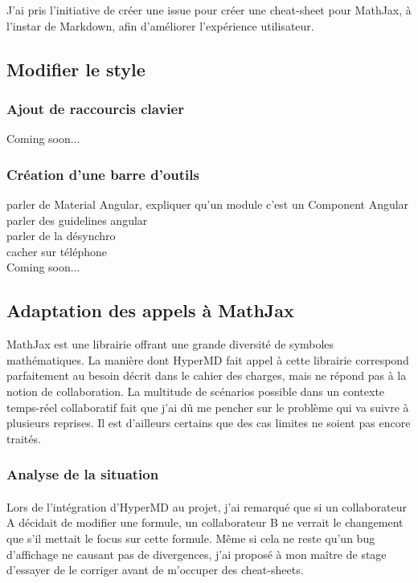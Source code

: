 \documentclass[12pt]{article}
\begin{document}
J'ai pris l'initiative de créer une issue pour créer une cheat-sheet pour MathJax, à l'instar de Markdown, afin d'améliorer l'expérience utilisateur.\\

\newpage
\subsection{Modifier le style}
\subsubsection{Ajout de raccourcis clavier}
Coming soon...

\subsubsection{Création d'une barre d'outils}
parler de Material Angular, expliquer qu'un module c'est un Component Angular\\
parler des guidelines angular\\
parler de la désynchro\\
cacher sur téléphone\\
Coming soon...

\newpage
\subsection{Adaptation des appels à MathJax}
MathJax est une librairie offrant une grande diversité de symboles mathématiques. La manière dont HyperMD fait appel à cette librairie correspond parfaitement au besoin décrit dans le cahier des charges, mais ne répond pas à la notion de collaboration. La multitude de scénarios possible dans un contexte temps-réel collaboratif fait que j'ai dû me pencher sur le problème qui va suivre à plusieurs reprises. Il est d'ailleurs certains que des cas limites ne soient pas encore traités.

\subsubsection{Analyse de la situation}
\paragraph{}
Lors de l'intégration d'HyperMD au projet, j'ai remarqué que si un collaborateur A décidait de modifier une formule, un collaborateur B ne verrait le changement que s'il mettait le focus sur cette formule. Même si cela ne reste qu'un bug d'affichage ne causant pas de divergences, j'ai proposé à mon maître de stage d'essayer de le corriger avant de m'occuper des cheat-sheets.
\end{document}
